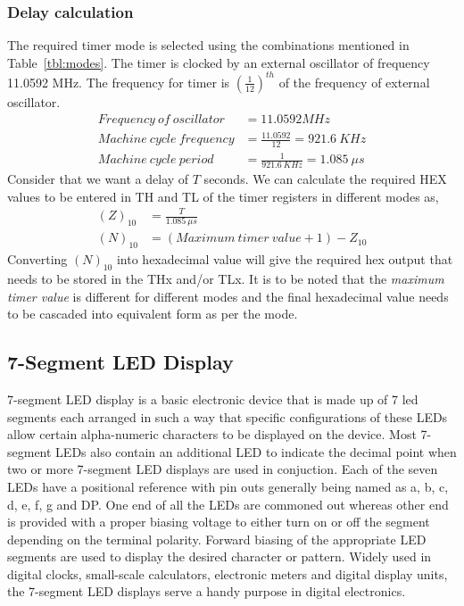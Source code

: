 \documentclass{lab_sheet}
\begin{document}
\subsubsection{Delay calculation}
The required timer mode is selected using the combinations mentioned in Table~\ref{tbl:modes}. The timer is clocked by an external oscillator of frequency 11.0592 MHz. The frequency for timer is $(\frac{1}{12})^{th}$ of the frequency of external oscillator.
       \begin{equation*}
        \begin{aligned}
        Frequency~of~oscillator &= 11.0592 MHz\\
        Machine~cycle~frequency &= \frac{11.0592}{12}=921.6~KHz\\
        Machine~cycle~period &= \frac{1}{921.6~KHz}=1.085~\mu s
    \end{aligned}
       \end{equation*} 
        Consider that we want a delay of $T$ seconds. We can calculate the required HEX values to be entered in TH and TL of the timer registers in different modes as,\\
        \begin{equation*}
            \begin{aligned}
            (Z)_{10}&=\frac{T}{1.085~\mu s}\\
            (N)_{10}&=(Maximum~timer~value+1)-Z_{10}
        \end{aligned}
        \end{equation*}
        Converting $(N)_{10}$ into hexadecimal value will give the required hex output that needs to be stored in the THx and/or TLx. It is to be noted that the \textit{maximum timer value} is different for different modes and the final hexadecimal value needs to be cascaded into equivalent form as per the mode.
    \subsection{7-Segment LED Display}
    7-segment LED display is a basic electronic device that is made up of 7 led segments each arranged in such a way that specific configurations of these LEDs allow certain alpha-numeric characters to be displayed on the device. Most 7-segment LEDs also contain an additional LED to indicate the decimal point when two or more 7-segment LED displays are used in conjuction. Each of the seven LEDs have a positional reference with pin outs generally being named as a, b, c, d, e, f, g and DP. One end of all the LEDs are commoned out whereas other end is provided with a proper biasing voltage to either turn on or off the segment depending on the terminal polarity. Forward biasing of the appropriate LED segments are used to display the desired character or pattern. Widely used in digital clocks, small-scale calculators, electronic meters and digital display units, the 7-segment LED displays serve a handy purpose in digital electronics.
\end{document}
